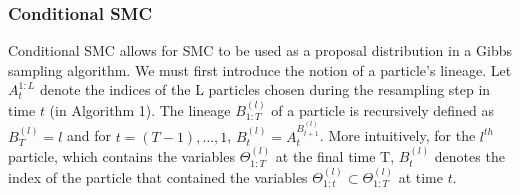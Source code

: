 \documentclass{article}
\begin{document}
\subsubsection{Conditional SMC}
Conditional SMC \cite{andrieu2010particle} allows for SMC to be used as a proposal distribution in a Gibbs sampling algorithm. We must first introduce the notion of a particle's lineage. 
Let $A_t^{1:L}$ denote the indices of the L particles chosen during the resampling step in time $t$ (in Algorithm 1). The lineage $B_{1:T}^{(l)}$ of a particle is recursively defined as 
$B_T^{(l)} = l$ and for $t=(T-1),\ldots,1$,\hspace{1mm} 
$B_t^{(l)} = A_t^{B_{t+1}^{(l)}}$. More intuitively, for the $l^{th}$ particle, which contains the variables 
$\Theta_{1:T}^{(l)}$ at the final time T, $B_t^{(l)}$ denotes the index of the particle that contained the variables 
$\Theta_{1:t}^{(l)}$$\subset$$\Theta_{1:T}^{(l)}$ at time $t$.
\end{document}
